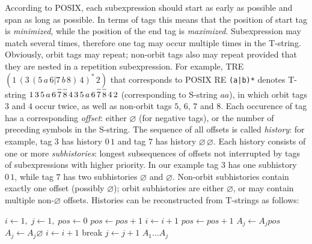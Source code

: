 \documentclass{article}
\newcommand{\Xset}{\!\leftarrow\!}
\newcommand{\Xin}{\!\in\!}
\newcommand{\Xeq}{\!=\!}
\newcommand*{\Xbar}[1]{\overline{#1\vphantom{\bar{#1}}}}
\theoremstyle{definition}
\begin{document}
\begin{multicols}{2}
According to POSIX, each subexpression should start as early as possible and span as long as possible.
In terms of tags this means that the position of start tag is \emph{minimized},
while the position of the end tag is \emph{maximized}.
Subexpression may match several times, therefore one tag may occur multiple times in the T-string.
Obviously, orbit tags may repeat;
non-orbit tags also may repeat provided that they are nested in a repetition subexpression.
For example, TRE $(1 \, (3 \, (5 \, a \, 6 | 7 \, b \, 8) \, 4)^* \, 2)$ that corresponds to POSIX RE \texttt{(a|b)*}
denotes T-string $1\, 3\, 5\, a\, 6\, \Xbar{7}\, \Xbar{8}\, 4\, 3\, 5\, a\, 6\, \Xbar{7}\, \Xbar{8}\, 4\, 2$
(corresponding to S-string $aa$),
in which orbit tags $3$ and $4$ occur twice, as well as non-orbit tags $5$, $6$, $7$ and $8$.
Each occurence of tag has a corresponding \emph{offset}:
either $\varnothing$ (for negative tags), or the number of preceding symbols in the S-string.
The sequence of all offsets is called \emph{history}:
for example, tag $3$ has history $0 \, 1$ and tag $7$ has history $\varnothing \, \varnothing$.
Each history consists of one or more \emph{subhistories}:
longest subsequences of offsets not interrupted by tags of subexpressions with higher priority.
In our example tag $3$ has one subhistory $0 \, 1$, while tag $7$ has two subhistories $\varnothing$ and $\varnothing$.
Non-orbit subhistories contain exactly one offset (possibly $\varnothing$);
orbit subhistories are either $\varnothing$, or may contain multiple non-$\varnothing$ offsets.
Histories can be reconstructed from T-strings as follows:

    \begin{algorithm}[H] \DontPrintSemicolon {} 
     {
        $i \Xset 1, \; j \Xset 1, \; pos \Xset 0$ \;
         {
            \While {$i \leq n$ and $a_i \!\not\in\! \{t, \Xbar{t}\}$} {
                \lIf {$a_i \Xin \Sigma$} {$pos \Xset pos \!+\! 1$}
                $i \Xset i \!+\! 1$ \;
            }
             {
                \lIf {$a_i \Xin \Sigma$}   {$pos \Xset pos \!+\! 1$}
                \lIf {$a_i \Xeq t$}        {$A_j \Xset A_j pos$}
                \lIf {$a_i \Xeq \Xbar{t}$} {$A_j \Xset A_j \varnothing$}
                $i \Xset i \!+\! 1$ \;
            }
             {break}
            $j \Xset j \!+\! 1$ \;
        }
        \Return $A_1 \dots A_j$ \;
    }
    \end{algorithm}


\end{multicols}
\end{document}
